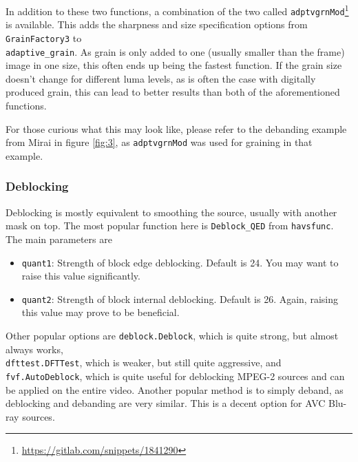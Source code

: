 \documentclass{scrartcl}
\begin{document}
In addition to these two functions, a combination of the two called \texttt{adptvgrnMod}\footnote{\url{https://gitlab.com/snippets/1841290}} is available. This adds the sharpness and size specification options from \texttt{GrainFactory3} to\\ \texttt{adaptive\_grain}. As grain is only added to one (usually smaller than the frame) image in one size, this often ends up being the fastest function. If the grain size doesn't change for different luma levels, as is often the case with digitally produced grain, this can lead to better results than both of the aforementioned functions. 

For those curious what this may look like, please refer to the debanding example from Mirai in figure \ref{fig:3}, as \texttt{adptvgrnMod} was used for graining in that example.

\subsubsection{Deblocking}

Deblocking is mostly equivalent to smoothing the source, usually with another mask on top.  The most popular function here is \texttt{Deblock\_QED} from \texttt{havsfunc}.  The main parameters are
\begin{itemize}
\item \texttt{quant1}: Strength of block edge deblocking. Default is 24.  You may want to raise this value significantly.
\item \texttt{quant2}: Strength of block internal deblocking. Default is 26.  Again, raising this value may prove to be beneficial.
\end{itemize}
Other popular options are \texttt{deblock.Deblock}, which is quite strong, but almost always works,\\ \texttt{dfttest.DFTTest}, which is weaker, but still quite aggressive, and \texttt{fvf.AutoDeblock}, which is quite useful for deblocking MPEG-2 sources and can be applied on the entire video.  Another popular method is to simply deband, as deblocking and debanding are very similar.  This is a decent option for AVC Blu-ray sources.

%
%
\end{document}
